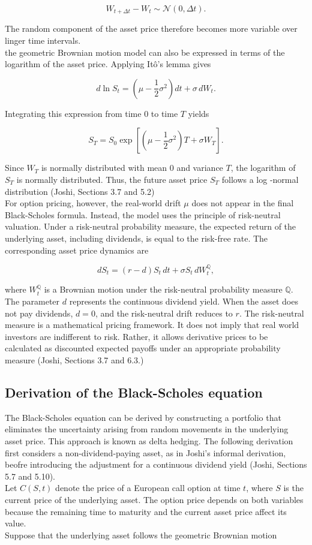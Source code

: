\documentclass{article}
\begin{document}
	\[
	W_{t+\Delta t}-W_t \sim \mathcal{N}(0, \Delta t).
	\]
	
	The random component of the asset price therefore becomes more variable over linger time intervals. \\
	the geometric Brownian motion model can also be expressed in terms of the logarithm of the asset price. Applying It\^o's lemma gives 
	
	\[
	d\ln S_t = \left(\mu-\frac{1}{2}\sigma^2\right)dt + \sigma\,dW_t.
	\]
	
	Integrating this expression from time $0$ to time $T$ yields
	
	\[
	S_T = S_0 \exp\left[\left(\mu-\frac{1}{2}\sigma^2\right)T+\sigma W_T\right].
	\]
	
	Since $W_T$ is normally distributed with mean $0$ and variance $T$, the logarithm of $S_T$ is normally distributed. Thus, the future asset price $S_T$ follows a log -normal distribution (Joshi, Sections 3.7 and 5.2)\\
	For option pricing, however, the real-world drift $\mu$ does not appear in the final Black-Scholes formula. Instead, the model uses the principle of risk-neutral valuation. Under a risk-neutral probability measure, the expected return of the underlying asset, including dividends, is equal to the risk-free rate. The corresponding asset price dynamics are
	
	\[
	dS_t = (r-d)S_t\,dt+\sigma S_t\,dW_t^{\mathbb{Q}},
	\]
	
	where $W_t^{\mathbb{Q}}$ is a Brownian motion under the risk-neutral probability measure $\mathbb{Q}$.\\
	The parameter $d$ represents the continuous dividend yield. When the asset does not pay dividends, $d=0$, and the risk-neutral drift reduces to $r$. The risk-neutral measure is a mathematical pricing framework. It does not imply that real world investors are indifferent to risk. Rather, it allows derivative prices to be calculated as discounted expected payoffs under an appropriate probability measure (Joshi, Sections 3.7 and 6.3.)
	
	\subsection{Derivation of the Black-Scholes equation}
	
	The Black-Scholes equation can be derived by constructing a portfolio that eliminates the uncertainty arising from random movements in the underlying asset price. This approach is known as delta hedging. The following derivation first considers a non-dividend-paying asset, as in Joshi's informal derivation, beofre introducing the adjustment for a continuous dividend yield (Joshi, Sections 5.7 and 5.10).\\
	Let $C(S, t)$ denote the price of a European call option at time $t$, where $S$ is the current price of the underlying asset. The option price depends on both variables because the remaining time to maturity and the current asset price affect its value. \\
	Suppose that the underlying asset follows the geometric Brownian motion
	
\end{document}
